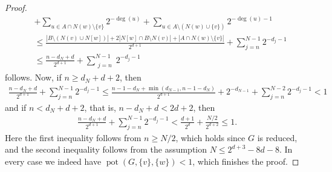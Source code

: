 \documentclass[10pt,a4paper]{amsart}
\DeclareMathOperator{\pot}{pot}
\begin{document}
\begin{proof}
\begin{align*}
        &+ \sum_{u \in A \cap N(w) \setminus \{v\}} 2^{-\deg(u)} + \sum_{u \in A \setminus (N(w) \cup \{v\})} 2^{-\deg(u) - 1}\\
        &\leq \frac{|B \setminus (N(v) \cup N[w])| + 2|N[w] \cap B \setminus N(v)| + |A \cap N(w) \setminus \{v\}|}{2^{d+1}}+ \sum_{j = n}^{N-1} 2^{-d_j - 1}\\
        &\leq \frac{n-d_N+d}{2^{d+1}} + \sum_{\substack{j = n}}^{N-1} 2^{-d_j - 1}
    \end{align*}
    follows.
    Now, if $n \geq d_N + d + 2$, then 
    \begin{align*}
        \frac{n-d_N+d}{2^{d+1}} + \sum_{j = n}^{N-1} 2^{-d_j - 1} \leq \frac{n-1-d_N+\min(d_{N-1}, n - 1 - d_N)}{2^{d+1}}+ 2^{-d_{N-1}} + \sum_{j=n}^{N-2} 2^{-d_j - 1} < 1
    \end{align*}
    and if $n < d_N + d + 2$, that is, $n - d_N + d < 2d+2$, then
    \begin{align*}
        \frac{n-d_N+d}{2^{d+1}} + \sum_{j = n}^{N-1} 2^{-d_j - 1} < \frac{d+1}{2^{d}} + \frac{N/2}{2^{d+2}} \leq 1.
    \end{align*}
    Here the first inequality follows from $n \geq N/2$, which holds since $G$ is reduced, and the second inequality follows from the assumption $N\leq 2^{d+3} - 8d - 8$. In every case we indeed have $\pot(G,\{v\}, \{w\}) < 1$, which finishes the proof.
\end{proof}
\end{document}
